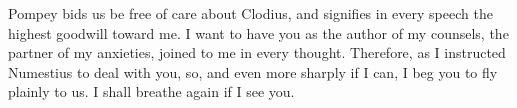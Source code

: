  Pompey bids us be free of care about Clodius, and signifies in every speech the highest goodwill toward me. I want to have you as the author of my counsels, the partner of my anxieties, joined to me in every thought. Therefore, as I instructed Numestius to deal with you, so, and even more sharply if I can, I beg you to fly plainly to us. I shall breathe again if I see you.
